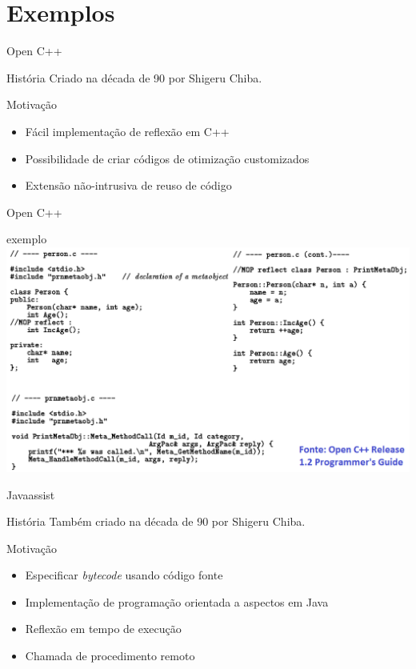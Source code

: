 \documentclass[12pt,t]{beamer}
\begin{document}
 	\section{Exemplos}
	 \begin{frame}{Open C++}
	 	\begin{block}{História}
			Criado na década de 90 por Shigeru Chiba.
 	 	\end{block}
	 	\begin{block}{Motivação}
			\begin{itemize}
 	 			\item Fácil implementação de reflexão em C++
 	 			\item Possibilidade de criar códigos de otimização customizados
				\item Extensão não-intrusiva de reuso de código
 	 		\end{itemize}
 	 	\end{block}
	 \end{frame}
	 \begin{frame}{Open C++}
 	 	\begin{block}{exemplo}
 	 		\includegraphics[width=1\textwidth]{example_open_cxx}
 	 	\end{block}
	 \end{frame}
	 \begin{frame}{Javaassist}
	 	\begin{block}{História}
			Também criado na década de 90 por Shigeru Chiba.
 	 	\end{block}
	 	\begin{block}{Motivação}
			\begin{itemize}
 	 			\item Especificar \emph{bytecode} usando código fonte
 	 			\item Implementação de programação orientada a aspectos em Java
 	 			\item Reflexão em tempo de execução
				\item Chamada de procedimento remoto
 	 		\end{itemize}
 	 	\end{block}
	 \end{frame}
\end{document}
